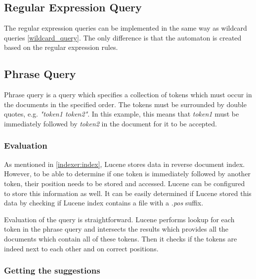 \subsection{Regular Expression Query}
The regular expression queries can be implemented in the same way as wildcard queries \ref{wildcard_query}. The only difference
is that the automaton is created based on the regular expression rules.

\subsection{Phrase Query}
\label{suggest_phrase_query}
Phrase query is a query which specifies a collection of tokens which must occur in the documents in the specified order.
The tokens must be surrounded by double quotes, e.g. \textit{"token1 token2"}. In this example, this means that \textit{token1} must be immediately followed by
\textit{token2} in the document for it to be accepted.

\subsubsection{Evaluation}
\label{prefix_evaluation}
As mentioned in \ref{indexer:index},
Lucene stores data in reverse document index. However, to be able to determine if one token is immediately followed by another
token, their position needs to be stored and accessed. Lucene can be configured to store this information as well.
It can be easily determined if Lucene stored this data by checking if Lucene index contains a file with a \textit{.pos}
suffix.

Evaluation of the query is straightforward. Lucene performs lookup for each token in the phrase query and intersects the
results which provides all the documents which contain all of these tokens. Then it checks if the tokens are indeed
next to each other and on correct positions.

\subsubsection{Getting the suggestions}
